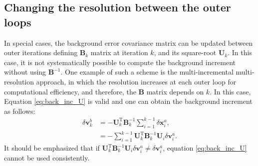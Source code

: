 \documentclass[npg, manuscript]{copernicus}
\begin{document}
\subsection{Changing the resolution between the outer loops}
In special cases, the background error covariance matrix can be updated between outer iterations defining $\mathbf{B}_k$ matrix at iteration $k$, and its square-root $\mathbf{U}_k$. In this case, it is not systematically possible to compute the background increment without using $\mathbf{B}^{-1}$. One example of such a scheme is the multi-incremental multi-resolution approach, in which the resolution increases at each outer loop for computational efficiency, and therefore, the $\mathbf{B}$ matrix depends on $k$. In this case, Equation \eqref{eq:back_inc_U} is valid and one can obtain the background increment as follows:
\begin{align}
\label{eq:back_inc_U_diff}
\delta \mathbf{v}^b_k & = - \mathbf{U}_k^\mathrm{T} \mathbf{B}_k^{-1} \sum_{i=1}^{k-1} \delta \mathbf{x}^a_i, \nonumber \\
& = - \sum_{i=1}^{k-1} \mathbf{U}_k^\mathrm{T} \mathbf{B}_k^{-1} \mathbf{U}_i \delta \mathbf{v}^a_i.
\end{align}
It should be emphasized that if $\mathbf{U}_k^\mathrm{T} \mathbf{B}_k^{-1} \mathbf{U}_i \delta \mathbf{v}^a_i \ne \delta \mathbf{v}^a_i$, equation \eqref{eq:back_inc_U} cannot be used consistently.\\ 
\end{document}
